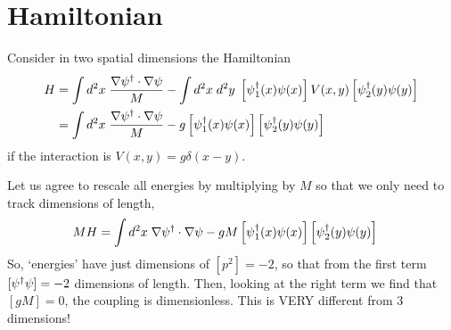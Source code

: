 \section{Hamiltonian}\label{sec:hamiltonian}

Consider in two spatial dimensions the Hamiltonian
\begin{align}
	H
	&= \int d^2x\; \frac{\nabla \psi{}^{\dagger} \cdot \nabla \psi}{M} - \int d^2x\; d^2y\; \left[\psi{}^{\dagger}_1(x) \psi(x)\right] V(x,y) \left[\psi{}^{\dagger}_2(y) \psi(y)\right]
	\\
	&= \int d^2x\; \frac{\nabla \psi{}^{\dagger} \cdot \nabla \psi}{M} - g \left[\psi{}^{\dagger}_1(x) \psi(x)\right] \left[\psi{}^{\dagger}_2(y) \psi(y)\right]
\end{align}
if the interaction is $V(x,y) = g \delta(x-y)$.

Let us agree to rescale all energies by multiplying by $M$ so that we only need to track dimensions of length,
\begin{align}
	MH 
	&= \int d^2x\; \nabla \psi{}^{\dagger} \cdot \nabla \psi - gM \left[\psi{}^{\dagger}_1(x) \psi(x)\right] \left[\psi{}^{\dagger}_2(y) \psi(y)\right]
\end{align}
So, `energies' have just dimensions of $[p^2] = -2$, so that from the first term $[\psi{}^{\dagger}\psi] = -2$ dimensions of length.
Then, looking at the right term we find that $[gM] = 0$, the coupling is dimensionless.
This is VERY different from 3 dimensions!

